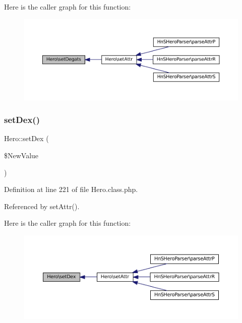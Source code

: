 Here is the caller graph for this function\+:\nopagebreak
\begin{figure}[H]
\begin{center}
\leavevmode
\includegraphics[width=350pt]{class_hero_a401e3a4a65354c605fa0958c725be87a_icgraph}
\end{center}
\end{figure}
\mbox{\label{class_hero_afc3941d527fd4cf15f6018f8b962ec0e}} 
\subsubsection{\texorpdfstring{set\+Dex()}{setDex()}}
{\footnotesize\ttfamily Hero\+::set\+Dex (\begin{DoxyParamCaption}\item[{}]{\$\+New\+Value }\end{DoxyParamCaption})}



Definition at line 221 of file Hero.\+class.\+php.



Referenced by set\+Attr().

Here is the caller graph for this function\+:\nopagebreak
\begin{figure}[H]
\begin{center}
\leavevmode
\includegraphics[width=350pt]{class_hero_afc3941d527fd4cf15f6018f8b962ec0e_icgraph}
\end{center}
\end{figure}
\mbox{\label{class_hero_a4ecce0522ff9c6eb513531a05d7fea8a}} 
